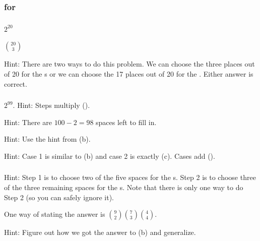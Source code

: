 \subsubsection{\answers for  \subcountbitstrings}

\subsubsection*{ \answers}
\begin{apart}
    \item $2^{20}$
    \item $\binom{20}{3}$
    \item Hint: There are two ways to do this problem.  We can choose the three places out of 20 for the s or we can choose the 17 places out of 20 for the .  Either answer is correct.
\end{apart}

\subsubsection*{ \answers}
\begin{apart}
    \item $2^{99}$. Hint: Steps multiply ().
    \item Hint: There are $100-2=98$ spaces left to fill in.
    \item Hint: Use the hint from (b).
    \item Hint: Case 1 is similar to (b) and case 2 is exactly (c).  Cases add (). 
\end{apart}

\subsubsection*{ \answers}
\begin{apart}
    \item Hint: Step 1 is to choose two of the five spaces for the s.  Step 2 is to choose three of the three remaining spaces for the s.  Note that there is only one way to do Step 2 (so you can safely ignore it).
    \item One way of stating the answer is $\binom{9}{2}\binom{7}{3}\binom{4}{4}$.
    \item Hint: Figure out how we got the answer to (b) and generalize.
\end{apart}

